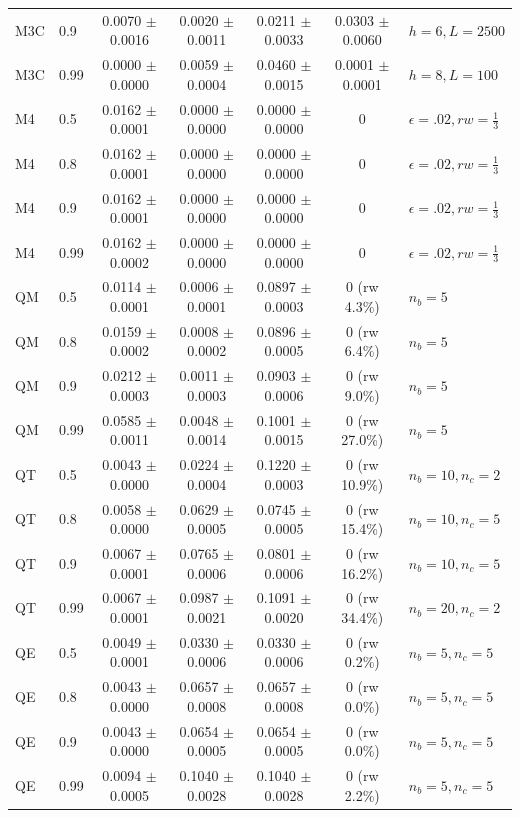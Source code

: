 \documentclass[10pt]{article}
\begin{document}
\begin{table}[t]
\begin{tabular}{@{}llccccl@{}}
M3C & 0.9 & 0.0070 $\pm$ 0.0016 & 0.0020 $\pm$ 0.0011 & 0.0211 $\pm$ 0.0033 & 0.0303 $\pm$ 0.0060 & $h{=}6,L{=}2500$ \\
M3C & 0.99 & 0.0000 $\pm$ 0.0000 & 0.0059 $\pm$ 0.0004 & 0.0460 $\pm$ 0.0015 & 0.0001 $\pm$ 0.0001 & $h{=}8,L{=}100$ \\
\midrule
M4 & 0.5 & 0.0162 $\pm$ 0.0001 & 0.0000 $\pm$ 0.0000 & 0.0000 $\pm$ 0.0000 & 0 & $\epsilon{=}.02,rw{=}\tfrac13$ \\
M4 & 0.8 & 0.0162 $\pm$ 0.0001 & 0.0000 $\pm$ 0.0000 & 0.0000 $\pm$ 0.0000 & 0 & $\epsilon{=}.02,rw{=}\tfrac13$ \\
M4 & 0.9 & 0.0162 $\pm$ 0.0001 & 0.0000 $\pm$ 0.0000 & 0.0000 $\pm$ 0.0000 & 0 & $\epsilon{=}.02,rw{=}\tfrac13$ \\
M4 & 0.99 & 0.0162 $\pm$ 0.0002 & 0.0000 $\pm$ 0.0000 & 0.0000 $\pm$ 0.0000 & 0 & $\epsilon{=}.02,rw{=}\tfrac13$ \\
\midrule
QM & 0.5 & 0.0114 $\pm$ 0.0001 & 0.0006 $\pm$ 0.0001 & 0.0897 $\pm$ 0.0003 & 0 (rw 4.3\%) & $n_b{=}5$ \\
QM & 0.8 & 0.0159 $\pm$ 0.0002 & 0.0008 $\pm$ 0.0002 & 0.0896 $\pm$ 0.0005 & 0 (rw 6.4\%) & $n_b{=}5$ \\
QM & 0.9 & 0.0212 $\pm$ 0.0003 & 0.0011 $\pm$ 0.0003 & 0.0903 $\pm$ 0.0006 & 0 (rw 9.0\%) & $n_b{=}5$ \\
QM & 0.99 & 0.0585 $\pm$ 0.0011 & 0.0048 $\pm$ 0.0014 & 0.1001 $\pm$ 0.0015 & 0 (rw 27.0\%) & $n_b{=}5$ \\
\midrule
QT & 0.5 & 0.0043 $\pm$ 0.0000 & 0.0224 $\pm$ 0.0004 & 0.1220 $\pm$ 0.0003 & 0 (rw 10.9\%) & $n_b{=}10,n_c{=}2$ \\
QT & 0.8 & 0.0058 $\pm$ 0.0000 & 0.0629 $\pm$ 0.0005 & 0.0745 $\pm$ 0.0005 & 0 (rw 15.4\%) & $n_b{=}10,n_c{=}5$ \\
QT & 0.9 & 0.0067 $\pm$ 0.0001 & 0.0765 $\pm$ 0.0006 & 0.0801 $\pm$ 0.0006 & 0 (rw 16.2\%) & $n_b{=}10,n_c{=}5$ \\
QT & 0.99 & 0.0067 $\pm$ 0.0001 & 0.0987 $\pm$ 0.0021 & 0.1091 $\pm$ 0.0020 & 0 (rw 34.4\%) & $n_b{=}20,n_c{=}2$ \\
\midrule
QE & 0.5 & 0.0049 $\pm$ 0.0001 & 0.0330 $\pm$ 0.0006 & 0.0330 $\pm$ 0.0006 & 0 (rw 0.2\%) & $n_b{=}5,n_c{=}5$ \\
QE & 0.8 & 0.0043 $\pm$ 0.0000 & 0.0657 $\pm$ 0.0008 & 0.0657 $\pm$ 0.0008 & 0 (rw 0.0\%) & $n_b{=}5,n_c{=}5$ \\
QE & 0.9 & 0.0043 $\pm$ 0.0000 & 0.0654 $\pm$ 0.0005 & 0.0654 $\pm$ 0.0005 & 0 (rw 0.0\%) & $n_b{=}5,n_c{=}5$ \\
QE & 0.99 & 0.0094 $\pm$ 0.0005 & 0.1040 $\pm$ 0.0028 & 0.1040 $\pm$ 0.0028 & 0 (rw 2.2\%) & $n_b{=}5,n_c{=}5$ \\
\bottomrule
\end{tabular}
\end{table}
\end{document}
